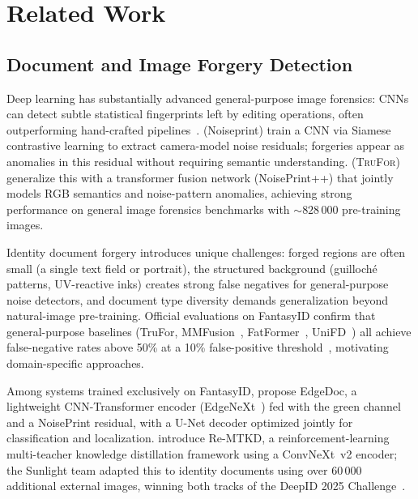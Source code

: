 \documentclass[final,5p,times,twocolumn,number]{elsarticle}
\begin{document}

\section{Related Work}
\label{sec:related}

\subsection{Document and Image Forgery Detection}

Deep learning has substantially advanced general-purpose image forensics:
CNNs can detect subtle statistical fingerprints left by editing operations,
often outperforming hand-crafted pipelines~\citep{bappy2019hybrid, mantranet2019}.
\citet{cozzolino2020noiseprint} (Noiseprint) train a CNN via Siamese
contrastive learning to extract camera-model noise residuals; forgeries appear
as anomalies in this residual without requiring semantic understanding.
\citet{trufor2023} (\textsc{TruFor}) generalize this with a transformer fusion
network (NoisePrint++) that jointly models RGB semantics and noise-pattern
anomalies, achieving strong performance on general image forensics benchmarks
with ${\sim}828\,000$ pre-training images.

Identity document forgery introduces unique challenges: forged regions are
often small (a single text field or portrait), the structured background
(guilloché patterns, UV-reactive inks) creates strong false negatives for
general-purpose noise detectors, and document type diversity demands
generalization beyond natural-image pre-training. Official evaluations on
FantasyID confirm that general-purpose baselines (TruFor, MMFusion~\citep{mmfusion2024},
FatFormer~\citep{fatformer2024}, UniFD~\citep{unifd2023}) all achieve
false-negative rates above 50\% at a 10\% false-positive
threshold~\citep{fantasyid2024}, motivating domain-specific approaches.

Among systems trained exclusively on FantasyID, \citet{edgedoc2025} propose
EdgeDoc, a lightweight CNN-Transformer encoder (EdgeNeXt~\citep{edgenext2022}) fed with the green
channel and a NoisePrint residual, with a U-Net decoder optimized jointly for
classification and localization. \citet{remtkd2025} introduce Re-MTKD, a
reinforcement-learning multi-teacher knowledge distillation framework using a
ConvNeXt~v2 encoder; the Sunlight team adapted this to identity documents using
over 60\,000 additional external images, winning both tracks of the DeepID
2025 Challenge~\citep{deepid2025challenge}.
\end{document}
